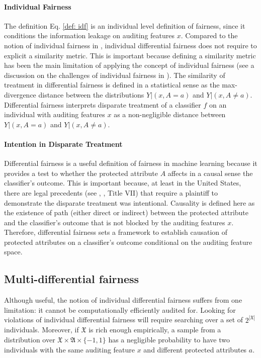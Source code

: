 \documentclass{article}
\begin{document}
\paragraph{Individual Fairness}
The definition Eq. \eqref{def: idf} is an individual level definition of fairness, since it conditions the information leakage on auditing features $x$. Compared to the notion of individual fairness in \cite{dwork2012fairness}, individual differential fairness does not require to explicit a similarity metric. This is important because defining a similarity metric has been the main limitation of applying the concept of individual fairness (see a discussion on the challenges of individual fairness in \cite{chouldechova2018frontiers}). The similarity of treatment in differential fairness is defined in a statistical sense as the max-divergence distance between the distributions $Y|(x, A=a)$ and $Y|(x, A\neq a)$. Differential fairness interprets disparate treatment of a classifier $f$ on an individual with auditing features $x$ as a non-negligible distance between $Y|(x, A=a)$ and $Y|(x, A\neq a)$. 

\paragraph{Intention in Disparate Treatment}
Differential fairness is a useful definition of fairness in machine learning because it provides a test to whether the protected attribute $A$ affects in a causal sense the classifier's outcome. This is important because, at least in the United States, there are legal precedents (see \cite{Ricci}, \cite{Loomis}, Title VII) that require a plaintiff to demonstrate the disparate treatment was intentional. Causality is defined here as the existence of path (either direct or indirect) between the protected attribute and the classifier's outcome that is not blocked by the auditing features $x$. Therefore, differential fairness sets a framework to establish causation of protected attributes on a classifier's outcome conditional on the auditing feature space. 

\subsection{Multi-differential fairness}
Although useful, the notion of individual differential fairness suffers from one limitation: it cannot be computationally efficiently audited for. Looking for violations of individual differential fairness will require searching over a set of $2^{|\mathfrak{X}|}$ individuals. Moreover, if $\mathfrak{X}$ is rich enough empirically, a sample from a distribution over $\mathfrak{X} \times \mathfrak{A}\times \{-1, 1\}$ has a negligible probability to have two individuals with the same auditing feature $x$ and different protected attributes $a$. 
\end{document}

